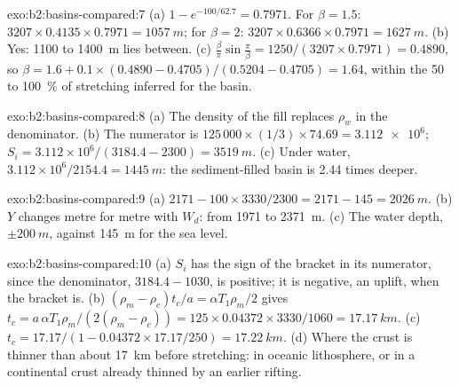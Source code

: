 \begin{solution}{exo:b2:basins-compared:7}
(a) $1 - e^{-100/62.7} = 0.7971$. For $\beta = 1.5$: $3207\times0.4135\times0.7971 =
\qty{1057}{m}$; for $\beta = 2$: $3207\times0.6366\times0.7971 = \qty{1627}{m}$. (b) Yes: 1100 to
\qty{1400}{m} lies between. (c) $\frac{\beta}{\pi}\sin\frac{\pi}{\beta} = 1250/(3207\times0.7971)
= 0.4890$, so $\beta = 1.6 + 0.1\times(0.4890 - 0.4705)/(0.5204 - 0.4705) = 1.64$, within the
50 to \qty{100}{\percent} of stretching inferred for the basin.
\end{solution}

\begin{solution}{exo:b2:basins-compared:8}
(a) The density of the fill replaces $\rho_w$ in the denominator. (b) The numerator is
$125\,000\times(1/3)\times74.69 = \num{3.112e6}$; $S_i = 3.112\times10^{6}/(3184.4 - 2300) =
\qty{3519}{m}$. (c) Under water, $3.112\times10^{6}/2154.4 = \qty{1445}{m}$: the sediment-filled
basin is 2.44 times deeper.
\end{solution}

\begin{solution}{exo:b2:basins-compared:9}
(a) $2171 - 100\times3330/2300 = 2171 - 145 = \qty{2026}{m}$. (b) $Y$ changes metre for metre
with $W_d$: from 1971 to \qty{2371}{m}. (c) The water depth, $\pm\qty{200}{m}$, against
\qty{145}{m} for the sea level.
\end{solution}

\begin{solution}{exo:b2:basins-compared:10}
(a) $S_i$ has the sign of the bracket in its numerator, since the denominator, $3184.4 - 1030$, is
positive; it is negative, an uplift, when the bracket is. (b) $(\rho_m - \rho_c)t_c/a =
\alpha T_1\rho_m/2$ gives $t_c = a\,\alpha T_1\rho_m/(2(\rho_m - \rho_c)) = 125\times0.04372\times
3330/1060 = \qty{17.17}{km}$. (c) $t_c = 17.17/(1 - 0.04372\times17.17/250) = \qty{17.22}{km}$.
(d) Where the crust is thinner than about \qty{17}{km} before stretching: in oceanic lithosphere,
or in a continental crust already thinned by an earlier rifting.
\end{solution}

